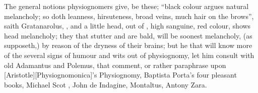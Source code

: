 The general notions physiognomers give, be these; \enquote{black
colour argues natural melancholy; so doth leanness, hirsuteness, broad veins,
much hair on the brows}, saith Gratanarolus,
, and a little head, out of \Aristotle{}, high
sanguine, red colour, shows head melancholy; they that stutter and are bald,
will be soonest melancholy, (as \Avicenna{} supposeth,) by reason of the dryness
of their brains; but he that will know more of the several signs of humour and
wits out of physiognomy, let him consult with old Adamantus and Polemus, that
comment, or rather paraphrase upon [Aristotle][\textlatin{Physiognomonica}]'s Physiognomy, Baptista Porta's
four pleasant books, Michael Scot ,
John de Indagine, Montaltus, Antony Zara. 

